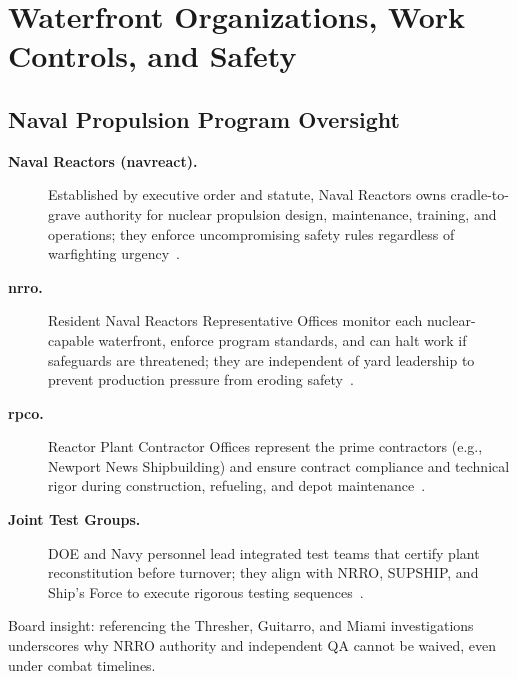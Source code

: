 \documentclass[../main.tex]{subfiles}
\begin{document}
\section{Waterfront Organizations, Work Controls, and Safety}
\minibib

\subsection{Naval Propulsion Program Oversight}
\begin{description}
\item[\textbf{Naval Reactors (\ac{navreact}).}] Established by executive order and statute, Naval Reactors owns cradle-to-grave authority for nuclear propulsion design, maintenance, training, and operations; they enforce uncompromising safety rules regardless of warfighting urgency~\autocite{edo-4-1-5-waterfront-work-control-2025}.
\item[\textbf{\ac{nrro}.}] Resident Naval Reactors Representative Offices monitor each nuclear-capable waterfront, enforce program standards, and can halt work if safeguards are threatened; they are independent of yard leadership to prevent production pressure from eroding safety~\autocite{edo-4-1-5-waterfront-work-control-2025}.
\item[\textbf{\ac{rpco}.}] Reactor Plant Contractor Offices represent the prime contractors (e.g., Newport News Shipbuilding) and ensure contract compliance and technical rigor during construction, refueling, and depot maintenance~\autocite{edo-4-1-5-waterfront-work-control-2025}.
\item[\textbf{Joint Test Groups.}] DOE and Navy personnel lead integrated test teams that certify plant reconstitution before turnover; they align with NRRO, SUPSHIP, and Ship's Force to execute rigorous testing sequences~\autocite{edo-4-1-5-waterfront-work-control-2025}.
\end{description}
Board insight: referencing the Thresher, Guitarro, and Miami investigations underscores why NRRO authority and independent QA cannot be waived, even under combat timelines.
\end{document}
